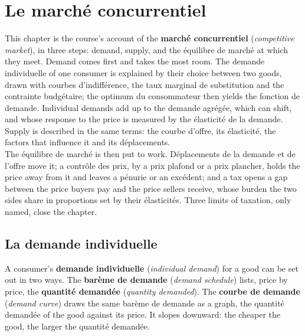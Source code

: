 \section{Le marché concurrentiel}

This chapter is the course's account of the \textbf{marché concurrentiel}
(\textit{competitive market}), in three steps: demand, supply, and the
équilibre de marché at which they meet. Demand comes first and takes the most room. The
demande individuelle of one consumer is explained by their choice between two goods,
drawn with courbes d'indifférence, the taux marginal de substitution and the
contrainte budgétaire; the optimum du consommateur then yields the fonction de
demande. Individual demands add up to the demande agrégée, which can shift, and
whose response to the price is measured by the élasticité de la demande. Supply is
described in the same terms: the courbe d'offre, its élasticité, the factors that
influence it and its déplacements.\\

The équilibre de marché is then put to work. Déplacements de la demande et de
l'offre move it;
a contrôle des prix, by a prix plafond or a prix plancher, holds the price away from
it and leaves a pénurie or an excédent; and a tax opens a gap between the price
buyers pay and the price sellers receive, whose burden the two sides share in
proportions set by their élasticités. Three limits of taxation, only named, close
the chapter.

\subsection{La demande individuelle}

A consumer's \textbf{demande individuelle} (\textit{individual demand}) for a good
can be set out in two ways. The \textbf{barème de demande} (\textit{demand
schedule}) lists, price by price, the \textbf{quantité demandée} (\textit{quantity
demanded}). The \textbf{courbe de demande} (\textit{demand curve}) draws the same
barème de demande as a graph, the quantité demandée of the good against its price.
It slopes downward: the cheaper the good, the larger the quantité demandée.

